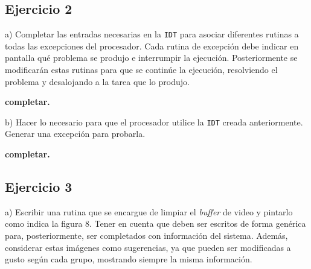 \vspace*{0.5cm} \noindent



\newpage





\subsection*{Ejercicio 2}
\vspace*{0.5cm}

\noindent
a) Completar las entradas necesarias en la \verb|IDT| para asociar diferentes rutinas a todas las
excepciones del procesador. Cada rutina de excepción debe indicar en pantalla qué problema se produjo
e interrumpir la ejecución. Posteriormente se modificarán estas rutinas para que se continúe la ejecución,
resolviendo el problema y desalojando a la tarea que lo produjo.

\vspace*{0.3cm}

\textbf{completar.}

\vspace*{0.5cm} \noindent



\noindent
b) Hacer lo necesario para que el procesador utilice la \verb|IDT| creada anteriormente. Generar una
excepción para probarla.

\vspace*{0.3cm}

\textbf{completar.}

\vspace*{0.5cm} \noindent



\newpage





\subsection*{Ejercicio 3}
\vspace*{0.5cm}

\noindent
a) Escribir una rutina que se encargue de limpiar el \textit{buffer} de video y pintarlo como indica la figura 8.
Tener en cuenta que deben ser escritos de forma genérica para, posteriormente, ser completados con información del
sistema. Además, considerar estas imágenes como sugerencias, ya que pueden ser modificadas a gusto según cada grupo,
mostrando siempre la misma información.

